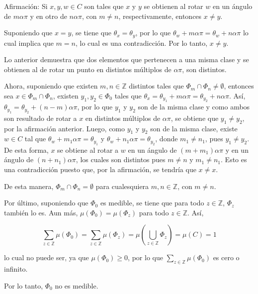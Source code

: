 \documentclass[fleqn]{article}
\begin{document}
	Afirmación: Si $ x,y,w \in C $ son tales que $ x $ y $ y $ se obtienen al rotar $ w $ en un ángulo de $ m \alpha \pi $ y en otro de $ n \alpha \pi $, con $ m \neq n $, respectivamente, entonces $ x \neq y $.

	Suponiendo que $ x = y $, se tiene que $ \theta_x = \theta_y $, por lo que $ \theta_w + m \alpha \pi = \theta_w + n \alpha \pi $ lo cual implica que $ m = n $, lo cual es una contradicción. Por lo tanto, $ x \neq y $.

	Lo anterior demuestra que dos elementos que pertenecen a una misma clase y se obtienen al de rotar un punto en distintos múltiplos de $ \alpha \pi $, son distintos.

	Ahora, suponiendo que existen $ m, n \in \mathbb{Z} $ distintos tales que $ \Phi_m \cap \Phi_n \neq \emptyset $, entonces sea $ x \in \Phi_m \cap \Phi_n $, existen $ y_1, y_2 \in \Phi_0 $ tales que $ \theta_x = \theta_{y_1} + m \alpha \pi = \theta_{y_2} + n \alpha \pi $. Así, $ \theta_{y_1} = \theta_{y_2} + (n-m) \alpha \pi $, por lo que $ y_1 $ y $ y_2 $ son de la misma clase y como ambos son resultado de rotar a $ x $ en distintos múltiplos de $ \alpha \pi $, se obtiene que $ y_1 \neq y_2 $, por la afirmación anterior. Luego, como $ y_1 $ y $ y_2 $ son de la misma clase, existe $ w \in C $ tal que $ \theta_w + m_1 \alpha \pi = \theta_{y_1} $ y $ \theta_w + n_1 \alpha \pi = \theta_{y_2} $, donde $ m_1 \neq n_1 $, pues $ y_1 \neq y_2 $. De esta forma, $ x $ se obtiene al rotar a $ w $ en un ángulo de $ (m + m_1) \alpha \pi $ y en un ángulo de $ (n + n_1) \alpha \pi $, los cuales son distintos pues $ m \neq n $ y $ m_1 \neq n_1 $. Esto es una contradicción puesto que, por la afirmación, se tendría que $ x \neq x $.

	De esta manera, $ \Phi_m \cap \Phi_n = \emptyset $ para cualesquiera $ m,n \in \mathbb{Z} $, con $ m \neq n $.

	Por último, suponiendo que $ \Phi_0 $ es medible, se tiene que para todo $ z \in \mathbb{Z} $, $ \Phi_z $ también lo es. Aun más, $ \mu (\Phi_0) = \mu (\Phi_z) $ para todo $ z \in \mathbb{Z} $. Así,

	\begin{equation*}
		\sum_{z \in \mathbb{Z}} \mu (\Phi_0) = \sum_{z \in \mathbb{Z}} \mu (\Phi_z) = \mu \left( \bigcup_{z \in \mathbb{Z}} \Phi_z \right) = \mu (C) = 1
	\end{equation*}

	lo cual no puede ser, ya que $ \mu (\Phi_0) \geq 0 $, por lo que $ \displaystyle \sum_{z \in \mathbb{Z}} \mu (\Phi_0) $ es cero o infinito.

	Por lo tanto, $ \Phi_0 $ no es medible.
\end{document}
